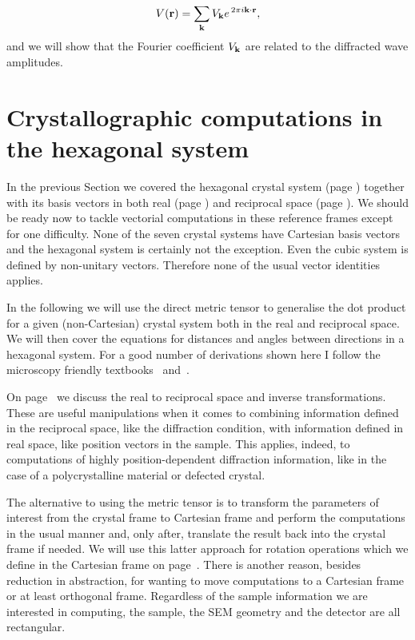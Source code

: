 \begin{equation}
V(\vb{r}) = \sum_{\vb{k}} V_{\vb{k}} e^{\,2 \pi i \vb{k}\cdot \vb{r}},
\end{equation}
and we will show that the Fourier coefficient $V_{\vb{k}}$ are related to the diffracted wave amplitudes.


\section{Crystallographic computations in the hexagonal system}
\label{chap:real+recAlg}

In the previous Section we covered the hexagonal crystal system (page \pageref{Sect:spaceLattice}) together with its basis vectors in both real (page \pageref{sec:latMB}) and reciprocal space (page \pageref{sec:recMB}). We should be ready now to tackle vectorial computations in these reference frames except for one difficulty. None of the seven crystal systems have Cartesian basis vectors and the hexagonal system is certainly not the exception. Even the cubic system is defined by non-unitary vectors. Therefore none of the usual vector identities applies.

In the following we will use the direct metric tensor to generalise the dot product for a given (non-Cartesian) crystal system both in the real and reciprocal space. We will then cover the equations for distances and angles between directions in a hexagonal system. For a good number of derivations shown here I follow the microscopy friendly textbooks~\cite{MarcTEM03} and~\cite{SoM}.

On page~\pageref{subChap:RealRec} we discuss the real to reciprocal space and inverse transformations. These are useful manipulations when it comes to combining information defined in the reciprocal space, like the diffraction condition, with information defined in real space, like position vectors in the sample. This applies, indeed, to computations of highly position-dependent diffraction information, like in the case of a polycrystalline material or defected crystal.

The alternative to using the metric tensor is to transform the parameters of interest from the crystal frame to Cartesian frame and perform the computations in the usual manner and, only after, translate the result back into the crystal frame if needed. We will use this latter approach for rotation operations which we define in the Cartesian frame on page~\pageref{subchap:basicRot}. There is another reason, besides reduction in abstraction, for wanting to move computations to a Cartesian frame or at least orthogonal frame. Regardless of the sample information we are interested in computing, the sample, the SEM geometry and the detector are all rectangular.

